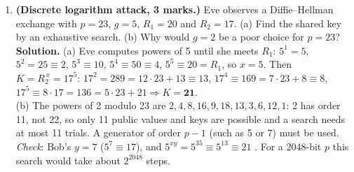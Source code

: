 \begin{enumerate}[leftmargin=1.6em,itemsep=4pt]
  \item \textbf{(Discrete logarithm attack, 3 marks.)} Eve observes a Diffie--Hellman exchange with $p = 23$, $g = 5$, $R_1 = 20$ and $R_2 = 17$. (a) Find the shared key by an exhaustive search. (b) Why would $g = 2$ be a poor choice for $p = 23$?\\
  \textbf{Solution.} (a) Eve computes powers of 5 until she meets $R_1$: $5^1 = 5$, $5^2 = 25 \equiv 2$, $5^3 \equiv 10$, $5^4 \equiv 50 \equiv 4$, $5^5 \equiv 20 = R_1$, so $x = 5$. Then $K = R_2^{\,x} = 17^5$: $17^2 = 289 = 12 \cdot 23 + 13 \equiv 13$, $17^4 \equiv 169 = 7 \cdot 23 + 8 \equiv 8$, $17^5 \equiv 8 \cdot 17 = 136 = 5 \cdot 23 + 21 \Rightarrow K = \mathbf{21}$.\\
  (b) The powers of 2 modulo 23 are $2, 4, 8, 16, 9, 18, 13, 3, 6, 12, 1$: 2 has order 11, not 22, so only 11 public values and keys are possible and a search needs at most 11 trials. A generator of order $p - 1$ (such as 5 or 7) must be used.\\
  \emph{Check}: Bob's $y = 7$ ($5^7 \equiv 17$), and $5^{xy} = 5^{35} \equiv 5^{13} \equiv 21$ \checkmark. For a 2048-bit $p$ this search would take about $2^{2048}$ steps.


\end{enumerate}

